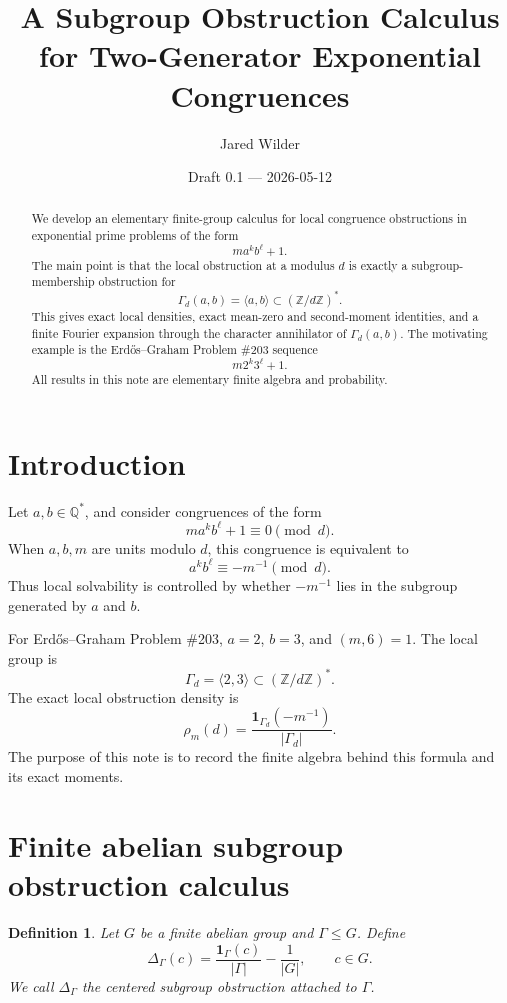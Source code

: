 \documentclass[11pt]{article}
\title{A Subgroup Obstruction Calculus for Two-Generator Exponential Congruences}
\author{Jared Wilder}
\date{Draft 0.1 --- 2026-05-12}
\newtheorem{definition}{Definition}
\newcommand{\Z}{\mathbb Z}
\newcommand{\Q}{\mathbb Q}
\newcommand{\1}{\mathbf 1}
\begin{document}
\maketitle

\begin{abstract}
We develop an elementary finite-group calculus for local congruence obstructions in exponential prime problems of the form
\[
m a^k b^\ell+1.
\]
The main point is that the local obstruction at a modulus \(d\) is exactly a subgroup-membership obstruction for
\[
\Gamma_d(a,b)=\langle a,b\rangle\subset(\Z/d\Z)^*.
\]
This gives exact local densities, exact mean-zero and second-moment identities, and a finite Fourier expansion through the character annihilator of \(\Gamma_d(a,b)\).  The motivating example is the Erd\H{o}s--Graham Problem \#203 sequence
\[
m2^k3^\ell+1.
\]
All results in this note are elementary finite algebra and probability.
\end{abstract}

\section{Introduction}

Let \(a,b\in\Q^*\), and consider congruences of the form
\[
m a^k b^\ell+1\equiv0\pmod d.
\]
When \(a,b,m\) are units modulo \(d\), this congruence is equivalent to
\[
a^k b^\ell\equiv -m^{-1}\pmod d.
\]
Thus local solvability is controlled by whether \(-m^{-1}\) lies in the subgroup generated by \(a\) and \(b\).

For Erd\H{o}s--Graham Problem \#203, \(a=2\), \(b=3\), and \((m,6)=1\).  The local group is
\[
\Gamma_d=\langle2,3\rangle\subset(\Z/d\Z)^*.
\]
The exact local obstruction density is
\[
\rho_m(d)=\frac{\1_{\Gamma_d}(-m^{-1})}{|\Gamma_d|}.
\]
The purpose of this note is to record the finite algebra behind this formula and its exact moments.

\section{Finite abelian subgroup obstruction calculus}

\begin{definition}
Let \(G\) be a finite abelian group and \(\Gamma\le G\).  Define
\[
\Delta_\Gamma(c)=\frac{\1_\Gamma(c)}{|\Gamma|}-\frac1{|G|},\qquad c\in G.
\]
We call \(\Delta_\Gamma\) the centered subgroup obstruction attached to \(\Gamma\).
\end{definition}
\end{document}

